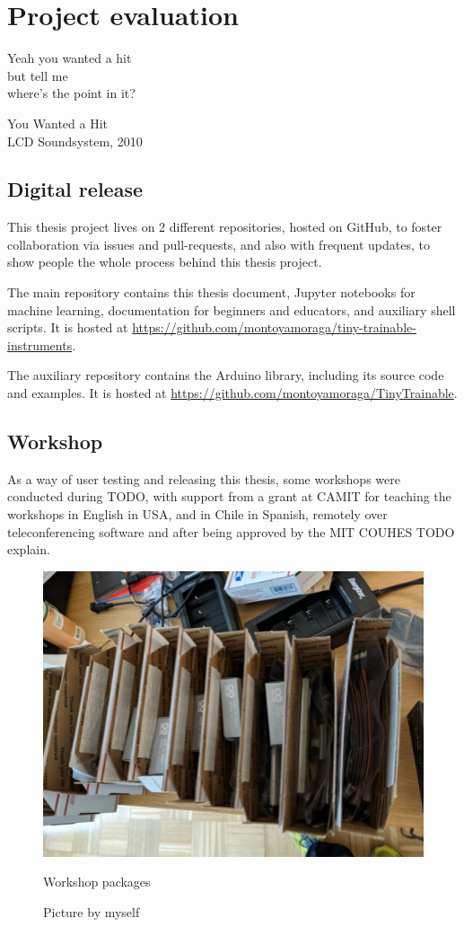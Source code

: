 \chapter{Project evaluation}

\epigraph{Yeah you wanted a hit \\ but tell me \\ where's the point in it?}{You Wanted a Hit \\ LCD Soundsystem, 2010}

\section{Digital release}

This thesis project lives on 2 different repositories, hosted on GitHub, to foster collaboration via \glspl{issue} and \glspl{pull-request}, and also with frequent updates, to show people the whole process behind this thesis project.

The main repository contains this thesis document, Jupyter notebooks for machine learning, documentation for beginners and educators, and auxiliary shell scripts. It is hosted at \url{https://github.com/montoyamoraga/tiny-trainable-instruments}.

The auxiliary repository contains the Arduino library, including its source code and examples. It is hosted at \url{https://github.com/montoyamoraga/TinyTrainable}.

\section{Workshop}

As a way of user testing and releasing this thesis, some workshops were conducted during TODO, with support from a grant at CAMIT for teaching the workshops in English in USA, and in Chile in Spanish, remotely over teleconferencing software and after being approved by the MIT COUHES TODO explain.


\begin{figure}[ht]
  \centering
  \includegraphics[width=0.75\linewidth,height=0.25\textheight,keepaspectratio]{images/workshop-packages.jpg}
  \caption{Workshop packages}
  \caption*{Picture by myself}
  \label{fig:workshop-packages}
\end{figure}


